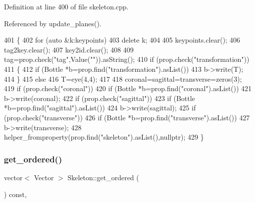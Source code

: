 Definition at line 400 of file skeleton.\+cpp.



Referenced by update\+\_\+planes().


\begin{DoxyCode}
401 \{
402     \textcolor{keywordflow}{for} (\textcolor{keyword}{auto} &k:keypoints)
403         \textcolor{keyword}{delete} k;
404 
405     keypoints.clear();
406     tag2key.clear();
407     key2id.clear();
408 
409     tag=prop.check(\textcolor{stringliteral}{"tag"},Value(\textcolor{stringliteral}{""})).asString();
410     \textcolor{keywordflow}{if} (prop.check(\textcolor{stringliteral}{"transformation"}))
411     \{
412         \textcolor{keywordflow}{if} (Bottle *b=prop.find(\textcolor{stringliteral}{"transformation"}).asList())
413             b->write(T);
414     \}
415     \textcolor{keywordflow}{else}
416         T=eye(4,4);
417 
418     coronal=sagittal=transverse=zeros(3);
419     \textcolor{keywordflow}{if} (prop.check(\textcolor{stringliteral}{"coronal"}))
420         \textcolor{keywordflow}{if} (Bottle *b=prop.find(\textcolor{stringliteral}{"coronal"}).asList())
421             b->write(coronal);
422     \textcolor{keywordflow}{if} (prop.check(\textcolor{stringliteral}{"sagittal"}))
423         \textcolor{keywordflow}{if} (Bottle *b=prop.find(\textcolor{stringliteral}{"sagittal"}).asList())
424             b->write(sagittal);
425     \textcolor{keywordflow}{if} (prop.check(\textcolor{stringliteral}{"transverse"}))
426         \textcolor{keywordflow}{if} (Bottle *b=prop.find(\textcolor{stringliteral}{"transverse"}).asList())
427             b->write(transverse);
428     helper\_fromproperty(prop.find(\textcolor{stringliteral}{"skeleton"}).asList(),\textcolor{keyword}{nullptr});
429 \}
\end{DoxyCode}
\mbox{\label{classassistive__rehab_1_1Skeleton_a9c56f7f9e243ae2c4c3fef6dbb051dc2}} 
\subsubsection{\texorpdfstring{get\+\_\+ordered()}{get\_ordered()}}
{\footnotesize\ttfamily vector$<$ Vector $>$ Skeleton\+::get\+\_\+ordered (\begin{DoxyParamCaption}{ }\end{DoxyParamCaption}) const\hspace{0.3cm}{\ttfamily [virtual]}, {\ttfamily [inherited]}}




